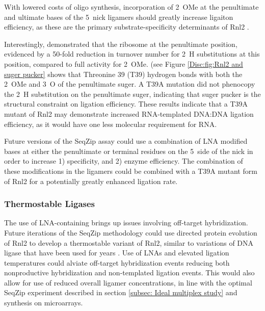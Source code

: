     With lowered costs of oligo synthesis, incorporation of 2\textprime~OMe at the penultimate and ultimate bases of the 5\textprime~nick ligamers should greatly increase ligaiton efficiency, as these are the primary substrate-specificity determinants of Rnl2 \citep{Nandakumar2004a, Nandakumar2006}.

    Interestingly, \citet{Nandakumar2004a} demonstrated that the ribosome at the penultimate position, evidenced by a 50-fold reduction in turnover number for 2\textprime~H substitutions at this position, compared to full activity for 2\textprime~OMe. \citet{Nandakumar2006} (see Figure \ref{Disc:fig:Rnl2 and suger pucker} shows that Threonine 39 (T39) hydrogen bonds with both the 2\textprime~OMe and 3\textprime~O of the penultimate suger. A T39A mutation did not phenocopy the 2\textprime~H substitution on the penultimate suger, indicating that suger pucker is the structural constraint on ligation efficiency. These results indicate that a T39A mutant of Rnl2 may demonstrate increased RNA-templated DNA:DNA ligation efficiency, as it would have one less molecular requirement for RNA.

    Future versions of the SeqZip assay could use a combination of LNA modified bases \citep{You2006} at either the penultimate or terminal residues on the 5\textprime~side of the nick in order to increase 1) specificity, and 2) enzyme efficiency. The combination of these modifications in the ligamers could be combined with a T39A mutant form of Rnl2 for a potentially greatly enhanced ligation rate.

  \subsubsection{Thermostable Ligases}\label{Disc:subsec:Thermostable Ligases}

    The use of LNA-containing brings up issues involving off-target hybridization. Future iterations of the SeqZip methodology could use directed protein evolution of Rnl2 \citep{Stemmer1994, Romero2009a} to develop a thermostable variant of Rnl2, similar to variations of DNA ligase that have been used for years \citep{Barany1991}. Use of LNAs and elevated ligation temperatures could alviate off-target hybridization events reducing both nonproductive hybridization and non-templated ligation events. This would also allow for use of reduced overall ligamer concentrations, in line with the optimal SeqZip experiment described in section \ref{subsec: Ideal multiplex study} and synthesis on microarrays.

